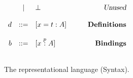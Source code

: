 \begin{figure}
\begin{center}
\begin{math}
\begin{array}{rclr}
&|&
\bot
& \qquad\textsl{Unused}
\\
\\
d 
&::=& 
[x = t : A] 
& \qquad\textsl{\bf Definitions}
\\
\\
b
&::=& [x \stackrel{p}{:} A]
& \qquad\textsl{\bf Bindings}
\\
\\


\end{array}
\end{math}
\end{center}

\caption{The {\system} representational language (Syntax).}
\label{ref:syntax-s2}
\end{figure}

